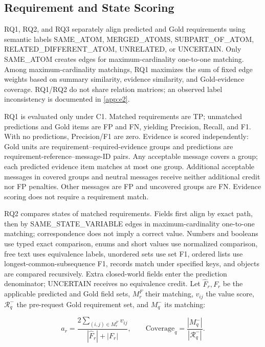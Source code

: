 \documentclass{article} %
\begin{document}
\FloatBarrier
\subsection{Requirement and State Scoring}
\label{app:c1}

{
RQ1, RQ2, and RQ3 separately align predicted and Gold requirements using semantic labels SAME\_\allowbreak ATOM, MERGED\_\allowbreak ATOMS, SUBPART\_\allowbreak OF\_\allowbreak ATOM, RELATED\_\allowbreak DIFFERENT\_\allowbreak ATOM, UNRELATED, or UNCERTAIN. Only SAME\_\allowbreak ATOM creates edges for maximum-cardinality one-to-one matching. Among maximum-cardinality matchings, RQ1 maximizes the sum of fixed edge weights based on summary similarity, evidence similarity, and Gold-evidence coverage. RQ1/RQ2 do not share relation matrices; an observed label inconsistency is documented in \ref{app:e2}.
\par}

RQ1 is evaluated only under C1. Matched requirements are TP; unmatched predictions and Gold items are FP and FN, yielding Precision, Recall, and F1. With no predictions, Precision/F1 are zero. Evidence is scored independently: Gold units are requirement--required-evidence groups and predictions are requirement-reference--message-ID pairs. Any acceptable message covers a group; each predicted evidence item matches at most one group. Additional acceptable messages in covered groups and neutral messages receive neither additional credit nor FP penalties. Other messages are FP and uncovered groups are FN. Evidence scoring does not require a requirement match.

RQ2 compares states of matched requirements. Fields first align by exact path, then by SAME\_\allowbreak STATE\_\allowbreak VARIABLE edges in maximum-cardinality one-to-one matching; correspondence does not imply a correct value. Numbers and booleans use typed exact comparison, enums and short values use normalized comparison, free text uses equivalence labels, unordered sets use set F1, ordered lists use longest-common-subsequence F1, records match under specified keys, and objects are compared recursively. Extra closed-world fields enter the prediction denominator; UNCERTAIN receives no equivalence credit. Let $\widehat F_r,F_r$ be the applicable predicted and Gold field sets, $M_r^F$ their matching, $v_{ij}$ the value score, $\mathcal R_q^-$ the pre-request Gold requirement set, and $M_q^-$ its matching:

\begin{equation}
a_r=\frac{2\sum_{(i,j)\in M_r^F}v_{ij}}{|\widehat F_r|+|F_r|},
\qquad
\mathrm{Coverage}_q=\frac{|M_q^-|}{|\mathcal R_q^-|}.
\label{eq:attribute-coverage}
\end{equation}
\end{document}
